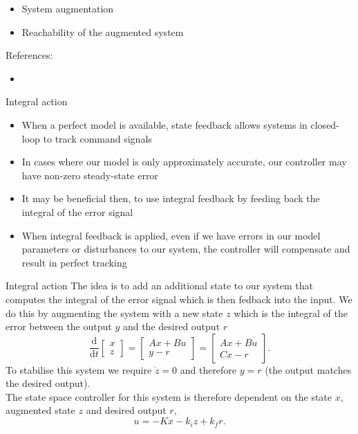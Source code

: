 \documentclass{beamer-control}
\begin{document}

\begin{SUMMARY}
\begin{itemize}
\item System augmentation
\item Reachability of the augmented system
\end{itemize}
\vfill References:
\begin{itemize}
\item {}
\end{itemize}
\end{SUMMARY}




\begin{frame}{Integral action}
\begin{itemize}
\item When a perfect model is available, state feedback allows systems in closed-loop to track command signals
\item In cases where our model is only approximately accurate, our controller may have non-zero steady-state error
\item It may be beneficial then, to use integral feedback by feeding back the integral of the error signal
\item When integral feedback is applied, even if we have errors in our model parameters or disturbances to our system, the controller will compensate and result in perfect tracking
\end{itemize}
\end{frame}

\begin{frame}{Integral action}
The idea is to add an additional state to our system that computes the integral of the error signal which is then fedback into the input. We do this by augmenting the system with a new state $z$ which is the integral of the error between the output $y$ and the desired output $r$
\[\frac{\mathrm{d}}{\mathrm{d} t} \begin{bmatrix}
	x \\ z
\end{bmatrix} = 
\begin{bmatrix}
	Ax+Bu\\ y-r
\end{bmatrix} = \begin{bmatrix}
Ax+Bu\\ Cx-r
\end{bmatrix}.\]
To stabilise this system we require $\dot{z}=0$ and therefore $y=r$  (the output matches the desired output).\\
The state space controller for this system is therefore dependent on the state $x$, augmented state $z$ and desired output $r$,
\[u=-Kx-k_iz+k_fr.\]
\end{frame}
\end{document}
